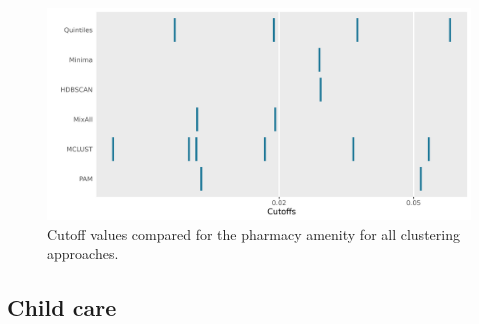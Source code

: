 \documentclass[11pt, a4paper]{article}
\begin{document}
\begin{figure}[H]
\centering
\includegraphics[width=\textwidth]{./cutoff_ticks/Pharmacy_ticks.png}
\caption[Pharmacy cutoff comparison]{Cutoff values compared for the pharmacy amenity for all clustering approaches.}\label{pharmacyticks}
\end{figure}









\justifying
\subsection{Child care}
\end{document}
